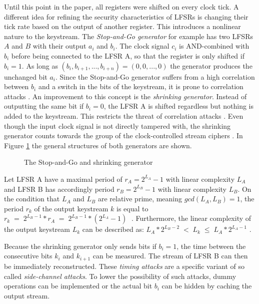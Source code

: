 Until this point in the paper, all registers were shifted on every clock tick. A different idea for refining the security characteristics of LFSRs is changing their tick rate based on the output of another register. This introduces a nonlinear nature to the keystream. The \emph{Stop-and-Go generator} for example has two LFSRs $A$ and $B$ with their output $a_i$ and $b_i$. The clock signal $c_i$ is AND-combined with $b_i$ before being connected to the LFSR A, so that the register is only shifted if $b_i=1$. As long as $(b_i, b_{i+1}, ..., b_{i+n}) = (0,0,...,0)$ the generator produces the unchanged bit $a_i$. \cite[pp. 89-90]{Beth.1985b} Since the Stop-and-Go generator suffers from a high correlation between $b_i$ and a switch in the bits of the keystream, it is prone to correlation attacks \cite[p. 156]{Klein.2013}. An improvement to this concept is the \emph{shrinking generator}. Instead of outputting the same bit if $b_i=0$, the LFSR A is shifted regardless but nothing is added to the keystream. This restricts the threat of correlation attacks \cite[p. 159]{Klein.2013}. Even though the input clock signal is not directly tampered with, the shrinking generator counts towards the group of the clock-controlled stream ciphers \cite[p. 23]{Robshaw.1995}. In Figure \ref{fig:clocked-generators} the general structures of both generators are shown.

\begin{figure}[htpb]
	\centering
	\small
	
	\caption{The Stop-and-Go \cite[pp. 89-90]{Beth.1985b} and shrinking generator \cite[p. 159]{Klein.2013}}
	\label{fig:clocked-generators}
\end{figure}

Let LFSR A have a maximal period of $r_A=2^{L_A}-1$ with linear complexity $L_A$ and LFSR B has accordingly period $r_B=2^{L_B}-1$ with linear complexity $L_B$. On the condition that $L_A$ and $L_B$ are relative prime, meaning $gcd(L_A, L_B)=1$, the period $r_k$ of the output keystream $k$ is equal to $r_k\;=\;2^{L_B-1}*r_A\;=\;2^{L_B-1}*(2^{L_A}-1)\;$ \cite[p. 25]{coppersmith1993shrinking}\cite[p. 159]{Klein.2013}. Furthermore, the linear complexity of the output keystream $L_k$ can be described as: \space $L_A*2^{L_B-2} \;<\; L_k \;\leq\; L_A*2^{L_A-1}$ \cite[p. 25]{coppersmith1993shrinking}. 

Because the shrinking generator only sends bits if $b_i=1$, the time between the consecutive bits $k_i$ and $k_{i+1}$ can be measured. The stream of LFSR B can then be immediately reconstructed. These \emph{timing attacks} are a specific variant of so called \emph{side-channel attacks}. To lower the possibility of such attacks, dummy operations can be implemented or the actual bit $b_i$ can be hidden by caching the output stream. \cite[pp. 163-164]{Klein.2013} \\\\

